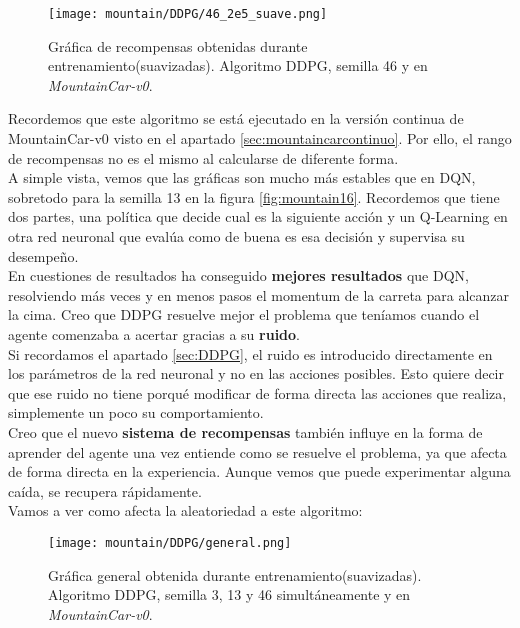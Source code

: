 \documentclass[11pt,fleqn]{book} %
\begin{document}
\begin{figure}[H]
	\centering\texttt{[image: mountain/DDPG/46\_2e5\_suave.png]}
	\caption{Gráfica de recompensas obtenidas durante entrenamiento(suavizadas). Algoritmo DDPG, semilla 46 y en \textit{MountainCar-v0}.}
	\label{fig:mountain18} %
\end{figure}

Recordemos que este algoritmo se está ejecutado en la versión continua de MountainCar-v0 visto en el apartado \ref{sec:mountaincarcontinuo}. Por ello, el rango de recompensas no es el mismo al calcularse de diferente forma. \\

A simple vista, vemos que las gráficas son mucho más estables que en DQN, sobretodo para la semilla 13 en la figura \ref{fig:mountain16}. Recordemos que tiene dos partes, una política que decide cual es la siguiente acción y un Q-Learning en otra red neuronal que evalúa como de buena es esa decisión y supervisa su desempeño. \\

En cuestiones de resultados ha conseguido \textbf{mejores resultados} que DQN, resolviendo más veces y en menos pasos el momentum de la carreta para alcanzar la cima. Creo que DDPG resuelve mejor el problema que teníamos cuando el agente comenzaba a acertar gracias a su \textbf{ruido}. \\

Si recordamos el apartado \ref{sec:DDPG}, el ruido es introducido directamente en los parámetros de la red neuronal y no en las acciones posibles. Esto quiere decir que ese ruido no tiene porqué modificar de forma directa las acciones que realiza, simplemente un poco su comportamiento. \\

Creo que el nuevo \textbf{sistema de recompensas} también influye en la forma de aprender del agente una vez entiende como se resuelve el problema, ya que afecta de forma directa en la experiencia. Aunque vemos que puede experimentar alguna caída, se recupera rápidamente. \\

Vamos a ver como afecta la aleatoriedad a este algoritmo: \\


\begin{figure}[H]
	\centering\texttt{[image: mountain/DDPG/general.png]}
	\caption{Gráfica general obtenida durante entrenamiento(suavizadas). Algoritmo DDPG, semilla 3, 13 y 46  simultáneamente y en \textit{MountainCar-v0}.}
	\label{fig:mountain19} %
\end{figure}
\end{document}
